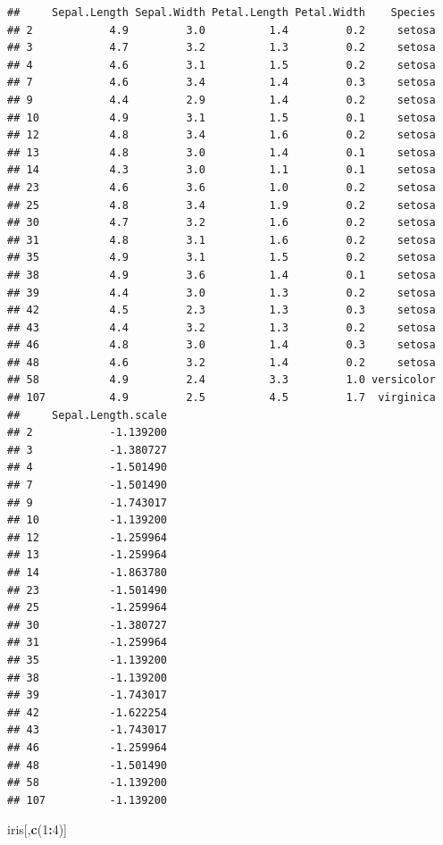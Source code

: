 \documentclass[]{book}
\newenvironment{Shaded}{\begin{snugshade}}{\end{snugshade}}
\newcommand{\KeywordTok}[1]{\textcolor[rgb]{0.13,0.29,0.53}{\textbf{#1}}}
\newcommand{\DecValTok}[1]{\textcolor[rgb]{0.00,0.00,0.81}{#1}}
\newcommand{\OperatorTok}[1]{\textcolor[rgb]{0.81,0.36,0.00}{\textbf{#1}}}
\newcommand{\NormalTok}[1]{#1}
\theoremstyle{definition}
\theoremstyle{definition}
\theoremstyle{definition}
\theoremstyle{remark}
\begin{document}
\begin{verbatim}
##     Sepal.Length Sepal.Width Petal.Length Petal.Width    Species
## 2            4.9         3.0          1.4         0.2     setosa
## 3            4.7         3.2          1.3         0.2     setosa
## 4            4.6         3.1          1.5         0.2     setosa
## 7            4.6         3.4          1.4         0.3     setosa
## 9            4.4         2.9          1.4         0.2     setosa
## 10           4.9         3.1          1.5         0.1     setosa
## 12           4.8         3.4          1.6         0.2     setosa
## 13           4.8         3.0          1.4         0.1     setosa
## 14           4.3         3.0          1.1         0.1     setosa
## 23           4.6         3.6          1.0         0.2     setosa
## 25           4.8         3.4          1.9         0.2     setosa
## 30           4.7         3.2          1.6         0.2     setosa
## 31           4.8         3.1          1.6         0.2     setosa
## 35           4.9         3.1          1.5         0.2     setosa
## 38           4.9         3.6          1.4         0.1     setosa
## 39           4.4         3.0          1.3         0.2     setosa
## 42           4.5         2.3          1.3         0.3     setosa
## 43           4.4         3.2          1.3         0.2     setosa
## 46           4.8         3.0          1.4         0.3     setosa
## 48           4.6         3.2          1.4         0.2     setosa
## 58           4.9         2.4          3.3         1.0 versicolor
## 107          4.9         2.5          4.5         1.7  virginica
##     Sepal.Length.scale
## 2            -1.139200
## 3            -1.380727
## 4            -1.501490
## 7            -1.501490
## 9            -1.743017
## 10           -1.139200
## 12           -1.259964
## 13           -1.259964
## 14           -1.863780
## 23           -1.501490
## 25           -1.259964
## 30           -1.380727
## 31           -1.259964
## 35           -1.139200
## 38           -1.139200
## 39           -1.743017
## 42           -1.622254
## 43           -1.743017
## 46           -1.259964
## 48           -1.501490
## 58           -1.139200
## 107          -1.139200
\end{verbatim}

\begin{Shaded}
\begin{Highlighting}[]
\NormalTok{iris[,}\KeywordTok{c}\NormalTok{(}\DecValTok{1}\OperatorTok{:}\DecValTok{4}\NormalTok{)]}
\end{Highlighting}
\end{Shaded}
\end{document}
